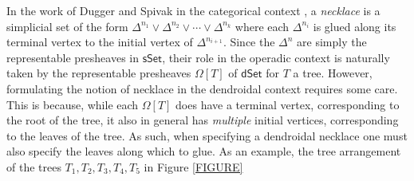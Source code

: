 \documentclass[a4paper,10pt
,draft
]{article}%
\numberwithin{equation}{section}
\numberwithin{figure}{section}
\theoremstyle{definition} %
\newcommand{\1}{\ensuremath{\mathbbm 1}}%
\begin{document}
In the work of Dugger and Spivak in the categorical context
\cite{DS11},
a \emph{necklace} is a simplicial set of the form
$\Delta^{n_1} \vee 
\Delta^{n_2} \vee \cdots \vee
\Delta^{n_k}$
where each $\Delta^{n_i}$ is glued along its terminal vertex to the initial vertex of $\Delta^{n_{i+1}}$.
Since the $\Delta^n$ are simply the representable presheaves in 
$\mathsf{sSet}$,
their role in the operadic context is naturally taken by the 
representable presheaves $\Omega[T]$ of $\mathsf{dSet}$
for $T$ a tree.
However, formulating the notion of necklace in the dendroidal context requires some care.
This is because, while each $\Omega[T]$ does have a terminal vertex, 
corresponding to the root of the tree, 
it also in general has 
\emph{multiple} initial vertices, corresponding to the leaves
of the tree.
As such, when specifying a dendroidal necklace
one must also specify the leaves along which to glue.
As an example, the tree arrangement of the trees
$T_1,T_2,T_3,T_4,T_5$
in Figure \ref{FIGURE}
\end{document}
